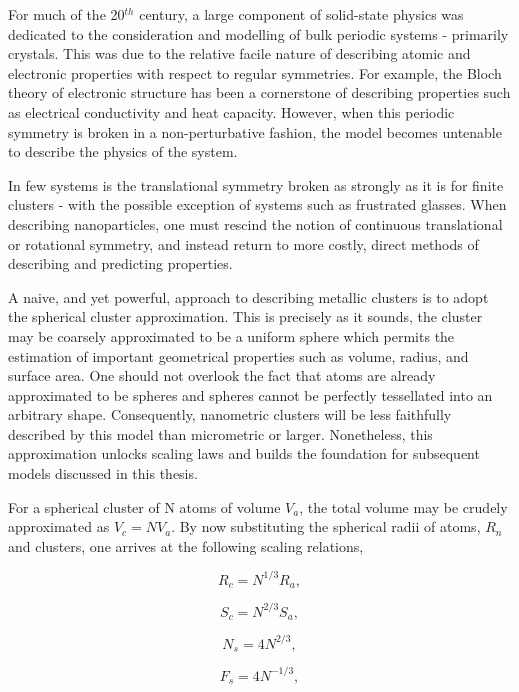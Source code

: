 For much of the 20$^{th}$ century, a large component of solid-state physics was dedicated to the consideration and modelling of bulk periodic systems - primarily crystals. This was due to the relative facile nature of describing atomic and electronic properties with respect to regular symmetries. For example, the Bloch theory of electronic structure has been a cornerstone of describing properties such as electrical conductivity and heat capacity. However, when this periodic symmetry is broken in a non-perturbative fashion, the model becomes untenable to describe the physics of the system. 

In few systems is the translational symmetry broken as strongly as it is for finite clusters - with the possible exception of systems such as frustrated glasses. When describing nanoparticles, one must rescind the notion of continuous translational or rotational symmetry, and instead return to more costly, direct methods of describing and predicting properties.

A naive, and yet powerful, approach to describing metallic clusters is to adopt the spherical cluster approximation. This is precisely as it sounds, the cluster may be coarsely approximated to be a uniform sphere which permits the estimation of important geometrical properties such as volume, radius, and surface area. One should not overlook the fact that atoms are already approximated to be spheres and spheres cannot be perfectly tessellated into an arbitrary shape. Consequently, nanometric clusters will be less faithfully described by this model than micrometric or larger. Nonetheless, this approximation unlocks scaling laws and builds the foundation for subsequent models discussed in this thesis.

For a spherical cluster of N atoms of volume $V_a$, the total volume may be crudely approximated as $V_c=NV_a$. By now substituting the spherical radii of atoms, $R_{n}$ and clusters, one arrives at the following scaling relations,

\noindent\begin{minipage}{.25\linewidth}
\centering
\begin{equation}
  R_c = N^{1/3}R_a,
\end{equation}
\end{minipage}%
\begin{minipage}{.25\linewidth}
\begin{equation}
  S_c = N^{2/3}S_a,
\end{equation}
\end{minipage}%
\begin{minipage}{.25\linewidth}
\begin{equation}
  N_s = 4N^{2/3},
  \label{eqn:NA_Surf}
\end{equation}
\end{minipage}%
\begin{minipage}{.25\linewidth}
\begin{equation}
  F_s = 4N^{-1/3},
\end{equation}
\end{minipage}\\

